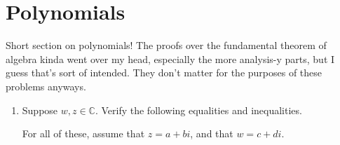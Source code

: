 \clearpage
\section{Polynomials}

Short section on polynomials! The proofs over the fundamental theorem of algebra kinda went over my head, especially the more analysis-y parts, but I guess that's sort of intended. They don't matter for the purposes of these problems anyways.

\begin{enumerate}
    \item[1] Suppose $w, z \in \mathbb{C}$. Verify the following equalities and inequalities.
    
    For all of these, assume that $z = a + bi$, and that $w = c + di$. 

    \begin{enumerate}


\end{enumerate}
\end{enumerate}

